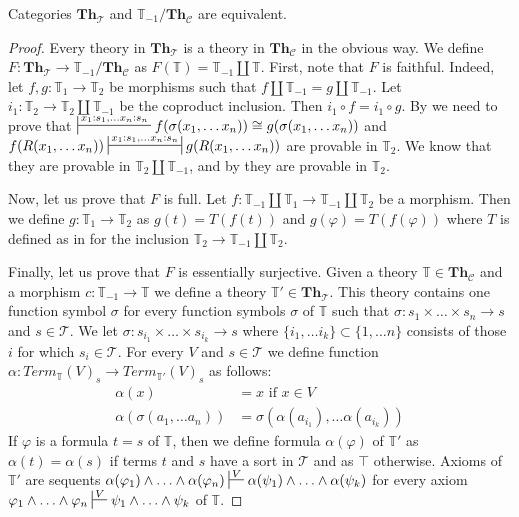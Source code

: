 \documentclass[reqno]{amsart}
\theoremstyle{definition}
\theoremstyle{remark}
\newcommand{\cat}[1]{\mathbf{#1}}
\newcommand{\Th}{\cat{Th}}
\newcommand{\ThC}{\Th_{\mathcal{C}}}
\newcommand{\ThT}{\Th_{\mathcal{T}}}
\numberwithin{figure}{section}
\begin{document}
\begin{prop}
Categories $\ThT$ and $\mathbb{T}_{-1}/\ThC$ are equivalent.
\end{prop}
\begin{proof}
Every theory in $\ThT$ is a theory in $\ThC$ in the obvious way.
We define $F : \ThT \to \mathbb{T}_{-1}/\ThC$ as $F(\mathbb{T}) = \mathbb{T}_{-1} \amalg \mathbb{T}$.
First, note that $F$ is faithful.
Indeed, let $f,g : \mathbb{T}_1 \to \mathbb{T}_2$ be morphisms such that $f \amalg \mathbb{T}_{-1} = g \amalg \mathbb{T}_{-1}$.
Let $i_1 : \mathbb{T}_2 \to \mathbb{T}_2 \amalg \mathbb{T}_{-1}$ be the coproduct inclusion.
Then $i_1 \circ f = i_1 \circ g$.
By  we need to prove that
$\sststile{}{x_1 : s_1, \ldots x_n : s_n} f(\sigma(x_1, \ldots x_n)) \cong g(\sigma(x_1, \ldots x_n))$ and
$f(R(x_1, \ldots x_n)) \ssststile{}{x_1 : s_1, \ldots x_n : s_n} g(R(x_1, \ldots x_n))$ are provable in $\mathbb{T}_2$.
We know that they are provable in $\mathbb{T}_2 \amalg \mathbb{T}_{-1}$, and by  they are provable in $\mathbb{T}_2$.

Now, let us prove that $F$ is full.
Let $f : \mathbb{T}_{-1} \amalg \mathbb{T}_1 \to \mathbb{T}_{-1} \amalg \mathbb{T}_2$ be a morphism.
Then we define $g : \mathbb{T}_1 \to \mathbb{T}_2$ as $g(t) = T(f(t))$ and $g(\varphi) = T(f(\varphi))$
where $T$ is defined as in  for the inclusion $\mathbb{T}_2 \to \mathbb{T}_{-1} \amalg \mathbb{T}_2$.

Finally, let us prove that $F$ is essentially surjective.
Given a theory $\mathbb{T} \in \ThC$ and a morphism $c : \mathbb{T}_{-1} \to \mathbb{T}$ we define a theory $\mathbb{T}' \in \ThT$.
This theory contains one function symbol $\sigma$ for every function symbols $\sigma$ of $\mathbb{T}$ such that $\sigma : s_1 \times \ldots \times s_n \to s$ and $s \in \mathcal{T}$.
We let $\sigma : s_{i_1} \times \ldots \times s_{i_k} \to s$ where $\{ i_1, \ldots i_k \} \subset \{ 1, \ldots n \}$ consists of those $i$ for which $s_i \in \mathcal{T}$.
For every $V$ and $s \in \mathcal{T}$ we define function $\alpha : Term_\mathbb{T}(V)_s \to Term_{\mathbb{T}'}(V)_s$ as follows:
\begin{align*}
\alpha(x) & = x \text{ if } x \in V \\
\alpha(\sigma(a_1, \ldots a_n)) & = \sigma(\alpha(a_{i_1}), \ldots \alpha(a_{i_k}))
\end{align*}
If $\varphi$ is a formula $t = s$ of $\mathbb{T}$, then we define formula $\alpha(\varphi)$ of $\mathbb{T}'$ as $\alpha(t) = \alpha(s)$
if terms $t$ and $s$ have a sort in $\mathcal{T}$ and as $\top$ otherwise.
Axioms of $\mathbb{T}'$ are sequents $\alpha(\varphi_1) \land \ldots \land \alpha(\varphi_n) \sststile{}{V} \alpha(\psi_1) \land \ldots \land \alpha(\psi_k)$
for every axiom $\varphi_1 \land \ldots \land \varphi_n \sststile{}{V} \psi_1 \land \ldots \land \psi_k$ of $\mathbb{T}$.


\end{proof}
\end{document}
